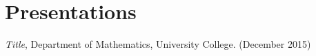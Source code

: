 \section{\sc Presentations}



\emph{Title}, Department of Mathematics, University College.  (December 2015)

\endinput
